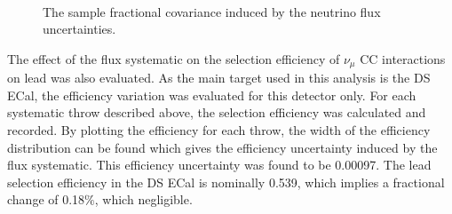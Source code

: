 \begin{figure}%
  \centering
  \\
  \caption{The sample fractional covariance induced by the neutrino flux uncertainties. }
  \label{fig:FluxCovarianceMatrices}
\end{figure}
\newline
\newline
The effect of the flux systematic on the selection efficiency of $\nu_\mu$ CC interactions on lead was also evaluated.  As the main target used in this analysis is the DS ECal, the efficiency variation was evaluated for this detector only.  For each systematic throw described above, the selection efficiency was calculated and recorded.  By plotting the efficiency for each throw, the width of the efficiency distribution can be found which gives the efficiency uncertainty induced by the flux systematic.  This efficiency uncertainty was found to be 0.00097.  The lead selection efficiency in the DS ECal is nominally 0.539, which implies a fractional change of 0.18$\%$, which  negligible.
